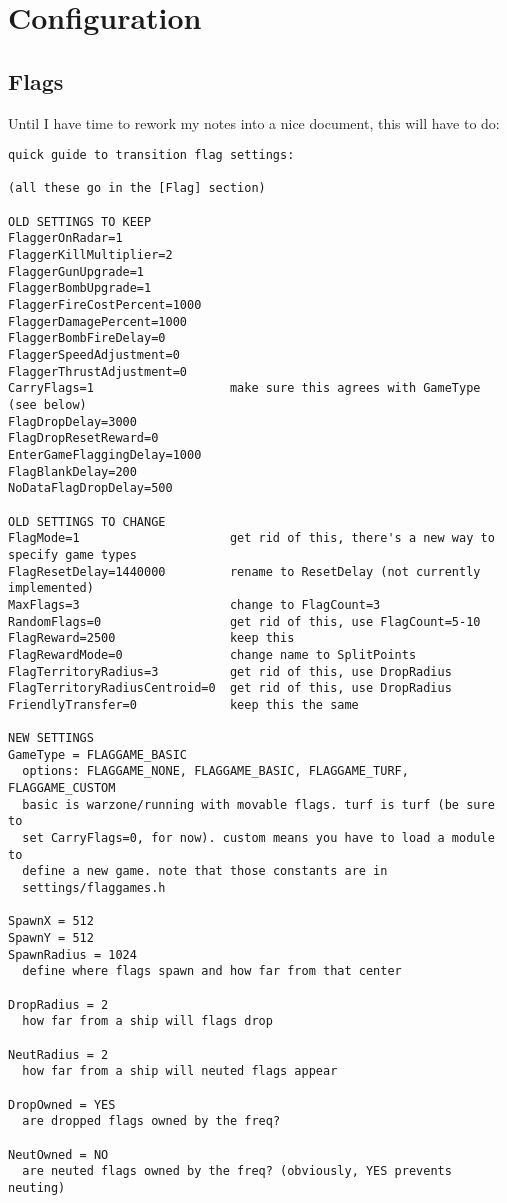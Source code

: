 \documentclass{article}
\begin{document}
\section{Configuration}

\subsection{Flags}

Until I have time to rework my notes into a nice document, this will
have to do:

\begin{verbatim}
quick guide to transition flag settings:

(all these go in the [Flag] section)

OLD SETTINGS TO KEEP
FlaggerOnRadar=1
FlaggerKillMultiplier=2
FlaggerGunUpgrade=1
FlaggerBombUpgrade=1
FlaggerFireCostPercent=1000
FlaggerDamagePercent=1000
FlaggerBombFireDelay=0
FlaggerSpeedAdjustment=0
FlaggerThrustAdjustment=0
CarryFlags=1                   make sure this agrees with GameType (see below)
FlagDropDelay=3000
FlagDropResetReward=0
EnterGameFlaggingDelay=1000
FlagBlankDelay=200
NoDataFlagDropDelay=500

OLD SETTINGS TO CHANGE
FlagMode=1                     get rid of this, there's a new way to specify game types
FlagResetDelay=1440000         rename to ResetDelay (not currently implemented)
MaxFlags=3                     change to FlagCount=3
RandomFlags=0                  get rid of this, use FlagCount=5-10
FlagReward=2500                keep this
FlagRewardMode=0               change name to SplitPoints
FlagTerritoryRadius=3          get rid of this, use DropRadius
FlagTerritoryRadiusCentroid=0  get rid of this, use DropRadius
FriendlyTransfer=0             keep this the same

NEW SETTINGS
GameType = FLAGGAME_BASIC
  options: FLAGGAME_NONE, FLAGGAME_BASIC, FLAGGAME_TURF, FLAGGAME_CUSTOM
  basic is warzone/running with movable flags. turf is turf (be sure to
  set CarryFlags=0, for now). custom means you have to load a module to
  define a new game. note that those constants are in
  settings/flaggames.h

SpawnX = 512
SpawnY = 512
SpawnRadius = 1024
  define where flags spawn and how far from that center

DropRadius = 2
  how far from a ship will flags drop

NeutRadius = 2
  how far from a ship will neuted flags appear

DropOwned = YES
  are dropped flags owned by the freq?

NeutOwned = NO
  are neuted flags owned by the freq? (obviously, YES prevents neuting)
\end{verbatim}
\end{document}
